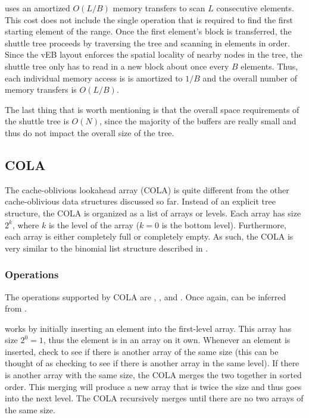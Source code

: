 \documentclass[preprint]{style}
\begin{document}
\Scan{} uses an amortized $O(L/B)$ memory transfers to scan $L$ consecutive
elements. This cost does not include the single \Search{} operation that is
required to find the first starting element of the range. Once the first
element's block is transferred, the shuttle tree proceeds by traversing the
tree and scanning in elements in order. Since the vEB layout enforces the
spatial locality of nearby nodes in the tree, the shuttle tree only has to read
in a new block about once every $B$ elements. Thus, each individual memory
access is is amortized to $1/B$ and the overall number of memory transfers is
$O(L/B)$.

The last thing that is worth mentioning is that the overall space requirements
of the shuttle tree is $O(N)$, since the majority of the buffers are really
small and thus do not impact the overall size of the tree.

\subsection{COLA}

The cache-oblivious lookahead array (COLA) is quite different from the other
cache-oblivious data structures discussed so far. Instead of an explicit tree
structure, the COLA is organized as a list of arrays or levels. Each array has
size $2^k$, where $k$ is the level of the array ($k = 0$ is the bottom level).
Furthermore, each array is either completely full or completely empty. As such,
the COLA is very similar to the binomial list structure described in
\cite{BentleySaxe}.

\subsubsection{Operations}

The operations supported by COLA are \Search{}, \Insert{}, and \Scan{}. Once
again, \Delete{} can be inferred from \Insert{}.

\Insert{} works by initially inserting an element into the first-level array.
This array has size $2^0 = 1$, thus the element is in an array on it own.
Whenever an element is inserted, check to see if there is another array of
the same size (this can be thought of as checking to see if there is another
array in the same level). If there is another array with the same size, the
COLA merges the two together in sorted order. This merging will produce a new
array that is twice the size and thus goes into the next level. The COLA
recursively merges until there are no two arrays of the same size.
\end{document}
